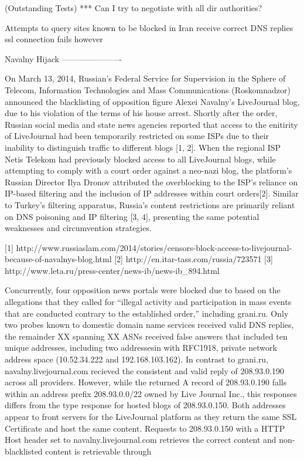 (Outstanding Tests)
*** Can I try to negotiate with all dir authorities?


Attempts to query sites known to be blocked in Iran receive correct DNS replies
ssl connection fails however




Navalny Hijack
----------------------

On March 13, 2014, Russian's Federal Service for Supervision in the Sphere of Telecom, Information Technologies and Mass Communications (Roskomnadzor) announced the blacklisting of opposition figure Alexei Navalny's LiveJournal blog, due to his violation of the terms of his house arrest. Shortly after the order, Russian social media and state news agencies reported that access to the enitirity of LiveJournal had been temporarily restricted on some ISPs due to their inability to distinguish traffic to different blogs [1, 2]. When the regional ISP Netis Telekom had previously blocked access to all LiveJournal blogs, while attempting to comply with a court order against a neo-nazi blog, the platform's Russian Director Ilya Dronov attributed the overblocking to the ISP's reliance on IP-based filtering and the inclusion of IP addresses within court orders[2]. Similar to Turkey's filtering apparatus, Russia's content restrictions are primarily reliant on DNS poisoning and IP filtering [3, 4], presenting the same potential weaknesses and circumvention strategies.

[1] http://www.russiaslam.com/2014/stories/censors-block-access-to-livejournal-because-of-navalnys-blog.html
[2] http://en.itar-tass.com/russia/723571
[3] http://www.leta.ru/press-center/news-ib/news-ib_894.html


Concurrently, four opposition news portals were blocked due to based on the allegations that they called for ``illegal activity and participation in mass events that are conducted contrary to the established order,'' including grani.ru. Only two probes known to domestic domain name services received valid DNS replies, the remainder XX spanning XX ASNs received false answers that included ten unique addresses, including two addressesin with RFC1918, private network address space (10.52.34.222 and 192.168.103.162). In contrast to grani.ru, navalny.livejournal.com recieved the consistent and valid reply of 208.93.0.190 across all providers. However, while the returned A record of 208.93.0.190 falls within an address prefix 208.93.0.0/22 owned by Live Journal Inc., this responses differs from the type response for hosted blogs of 208.93.0.150. Both addresses appear to front servers for the LiveJournal platform as they return the same SSL Certificate and host the same content. Requests to 208.93.0.150 with a HTTP Host header set to navalny.livejournal.com retrieves the correct content and non-blacklisted content is retrievable through

